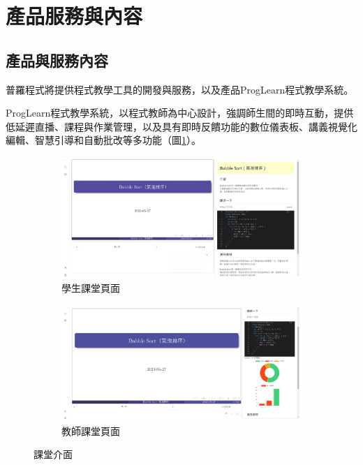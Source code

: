 \section{產品服務與內容}

\subsection{產品與服務內容}

普羅程式將提供程式教學工具的開發與服務，以及產品ProgLearn程式教學系統。

ProgLearn程式教學系統，以程式教師為中心設計，強調師生間的即時互動，提供低延遲直播、課程與作業管理，以及具有即時反饋功能的數位儀表板、講義視覺化編輯、智慧引導和自動批改等多功能（圖\ref{fig:Classroom}）。

\begin{figure}[H]
  \begin{subfigure}{0.5\linewidth}
    \centering
    \includegraphics[width=1\textwidth]{images/student.png}
    \caption{學生課堂頁面}
  \end{subfigure}
  \begin{subfigure}{0.5\linewidth}
    \centering
    \includegraphics[width=1\textwidth]{images/teacher.png}
    \caption{教師課堂頁面}
  \end{subfigure}
  \caption{課堂介面}
  \label{fig:Classroom}
\end{figure}

